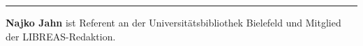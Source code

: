 \begin{center}\rule{0.5\linewidth}{\linethickness}\end{center}

\textbf{Najko Jahn} ist Referent an der Universitätsbibliothek Bielefeld
und Mitglied der LIBREAS-Redaktion.
